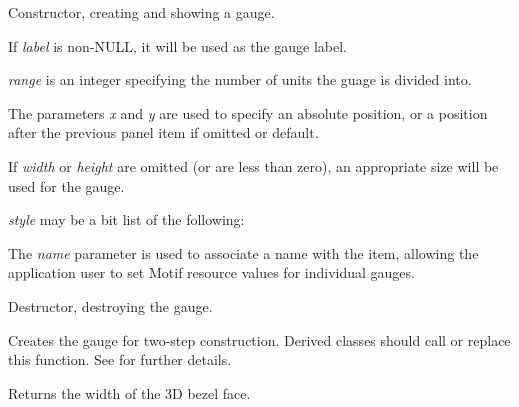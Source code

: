 Constructor, creating and showing a gauge.

If {\it label} is non-NULL, it will be used as the gauge label.

{\it range} is an integer specifying the number of units the
guage is divided into.

The parameters {\it x} and {\it y} are used to specify an absolute
position, or a position after the previous panel item if omitted or
default.

If {\it width} or {\it height} are omitted (or are less than zero), an
appropriate size will be used for the gauge.

{\it style} may be a bit list of the following:

\begin{twocollist}\itemsep=0pt
\end{twocollist}

The {\it name} parameter is used to associate a name with the item,
allowing the application user to set Motif resource values for
individual gauges.



Destructor, destroying the gauge.



Creates the gauge for two-step construction. Derived classes
should call or replace this function. See \rtfsp
for further details.



Returns the width of the 3D bezel face.



